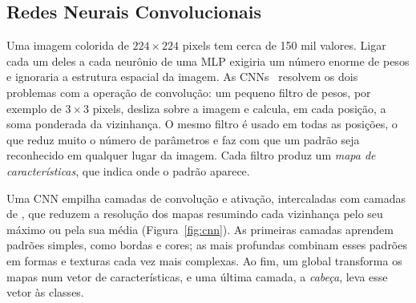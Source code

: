 \subsection{Redes Neurais Convolucionais}
\label{sec:cnn_background}

Uma imagem colorida de $224 \times 224$ pixels tem cerca de 150 mil valores. Ligar cada um deles a cada neurônio de uma MLP exigiria um número enorme de pesos e ignoraria a estrutura espacial da imagem. As \glspl{CNN}~\cite{lecun1998gradient} resolvem os dois problemas com a operação de convolução: um pequeno filtro de pesos, por exemplo de $3 \times 3$ pixels, desliza sobre a imagem e calcula, em cada posição, a soma ponderada da vizinhança. O mesmo filtro é usado em todas as posições, o que reduz muito o número de parâmetros e faz com que um padrão seja reconhecido em qualquer lugar da imagem. Cada filtro produz um \emph{mapa de características}, que indica onde o padrão aparece.

Uma CNN empilha camadas de convolução e ativação, intercaladas com camadas de , que reduzem a resolução dos mapas resumindo cada vizinhança pelo seu máximo ou pela sua média (Figura~\ref{fig:cnn}). As primeiras camadas aprendem padrões simples, como bordas e cores; as mais profundas combinam esses padrões em formas e texturas cada vez mais complexas. Ao fim, um  global transforma os mapas num vetor de características, e uma última camada, a \emph{cabeça}, leva esse vetor às classes.

